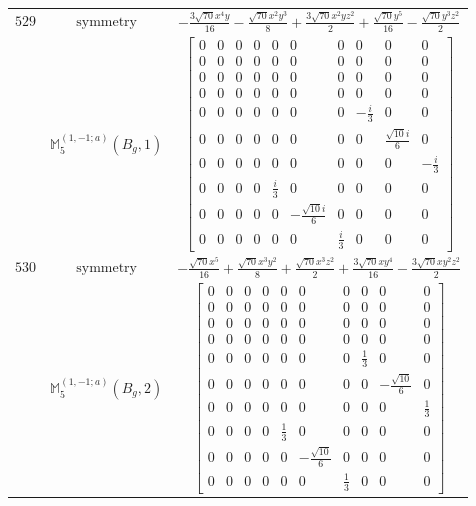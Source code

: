 \documentclass[fleqn,8pt,landscape]{jsarticle}
\begin{document}
\begin{longtable}{ccc}
$ 529 $ & $ \text{symmetry} $ & $ - \frac{3 \sqrt{70} x^{4} y}{16} - \frac{\sqrt{70} x^{2} y^{3}}{8} + \frac{3 \sqrt{70} x^{2} y z^{2}}{2} + \frac{\sqrt{70} y^{5}}{16} - \frac{\sqrt{70} y^{3} z^{2}}{2} $ \\
$  $ & $ \mathbb{M}_{5}^{(1,-1;a)}(B_{g},1) $ & $ \begin{bmatrix} 0 & 0 & 0 & 0 & 0 & 0 & 0 & 0 & 0 & 0 \\ 0 & 0 & 0 & 0 & 0 & 0 & 0 & 0 & 0 & 0 \\ 0 & 0 & 0 & 0 & 0 & 0 & 0 & 0 & 0 & 0 \\ 0 & 0 & 0 & 0 & 0 & 0 & 0 & 0 & 0 & 0 \\ 0 & 0 & 0 & 0 & 0 & 0 & 0 & - \frac{i}{3} & 0 & 0 \\ 0 & 0 & 0 & 0 & 0 & 0 & 0 & 0 & \frac{\sqrt{10} i}{6} & 0 \\ 0 & 0 & 0 & 0 & 0 & 0 & 0 & 0 & 0 & - \frac{i}{3} \\ 0 & 0 & 0 & 0 & \frac{i}{3} & 0 & 0 & 0 & 0 & 0 \\ 0 & 0 & 0 & 0 & 0 & - \frac{\sqrt{10} i}{6} & 0 & 0 & 0 & 0 \\ 0 & 0 & 0 & 0 & 0 & 0 & \frac{i}{3} & 0 & 0 & 0 \end{bmatrix} $ \\ \hline
$ 530 $ & $ \text{symmetry} $ & $ - \frac{\sqrt{70} x^{5}}{16} + \frac{\sqrt{70} x^{3} y^{2}}{8} + \frac{\sqrt{70} x^{3} z^{2}}{2} + \frac{3 \sqrt{70} x y^{4}}{16} - \frac{3 \sqrt{70} x y^{2} z^{2}}{2} $ \\
$  $ & $ \mathbb{M}_{5}^{(1,-1;a)}(B_{g},2) $ & $ \begin{bmatrix} 0 & 0 & 0 & 0 & 0 & 0 & 0 & 0 & 0 & 0 \\ 0 & 0 & 0 & 0 & 0 & 0 & 0 & 0 & 0 & 0 \\ 0 & 0 & 0 & 0 & 0 & 0 & 0 & 0 & 0 & 0 \\ 0 & 0 & 0 & 0 & 0 & 0 & 0 & 0 & 0 & 0 \\ 0 & 0 & 0 & 0 & 0 & 0 & 0 & \frac{1}{3} & 0 & 0 \\ 0 & 0 & 0 & 0 & 0 & 0 & 0 & 0 & - \frac{\sqrt{10}}{6} & 0 \\ 0 & 0 & 0 & 0 & 0 & 0 & 0 & 0 & 0 & \frac{1}{3} \\ 0 & 0 & 0 & 0 & \frac{1}{3} & 0 & 0 & 0 & 0 & 0 \\ 0 & 0 & 0 & 0 & 0 & - \frac{\sqrt{10}}{6} & 0 & 0 & 0 & 0 \\ 0 & 0 & 0 & 0 & 0 & 0 & \frac{1}{3} & 0 & 0 & 0 \end{bmatrix} $ \\ \hline

\end{longtable}
\end{document}
